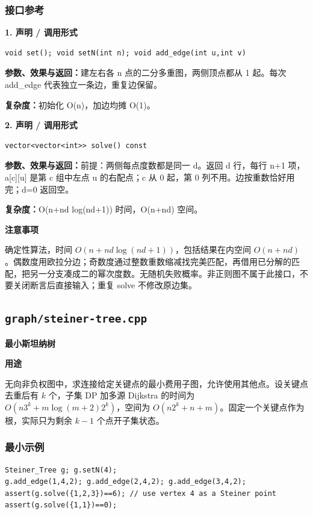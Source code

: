 \documentclass[UTF8,a4paper,10pt]{ctexart}
\newcommand{\TemplUsage}[1]{\textbf{用途}\par #1\par}
\newcommand{\TemplNote}[1]{\textbf{注意事项}\par #1\par}
\begin{document}
\subsubsection*{接口参考}
\noindent\begin{minipage}{\textwidth}
\textbf{1. 声明 / 调用形式}
\begin{lstlisting}
void set(); void setN(int n); void add_edge(int u,int v)
\end{lstlisting}
\textbf{参数、效果与返回：}建左右各 n 点的二分多重图，两侧顶点都从 1 起。每次 add\_edge 代表独立一条边，重复边保留。

\textbf{复杂度：}初始化 O(n)，加边均摊 O(1)。

\end{minipage}\par\vspace{0.4em}
\noindent\begin{minipage}{\textwidth}
\textbf{2. 声明 / 调用形式}
\begin{lstlisting}
vector<vector<int>> solve() const
\end{lstlisting}
\textbf{参数、效果与返回：}前提：两侧每点度数都是同一 d。返回 d 行，每行 n+1 项，a[c][u] 是第 c 组中左点 u 的右配点；c 从 0 起，第 0 列不用。边按重数恰好用完；d=0 返回空。

\textbf{复杂度：}O(n+nd log(nd+1)) 时间，O(n+nd) 空间。

\TemplNote{确定性算法，时间 $O(n+nd\log(nd+1))$，包括结果在内空间 $O(n+nd)$。偶数度用欧拉分边；奇数度通过整数重数缩减找完美匹配，再借用已分解的匹配，把另一分支凑成二的幂次度数。无随机失败概率。非正则图不属于此接口，不要关闭断言后直接输入；重复 solve 不修改原边集。}
\end{minipage}\par\vspace{0.4em}
\clearpage
\subsection{\texttt{graph/steiner-tree.cpp}}
\textbf{最小斯坦纳树}\par
\TemplUsage{无向非负权图中，求连接给定关键点的最小费用子图，允许使用其他点。设关键点去重后有 $k$ 个，子集 DP 加多源 Dijkstra 的时间为 $O(n3^k+m\log(m+2)2^k)$，空间为 $O(n2^k+n+m)$。固定一个关键点作为根，实际只为剩余 $k-1$ 个点开子集状态。}
\subsubsection*{最小示例}
\begin{lstlisting}
Steiner_Tree g; g.setN(4);
g.add_edge(1,4,2); g.add_edge(2,4,2); g.add_edge(3,4,2);
assert(g.solve({1,2,3})==6); // use vertex 4 as a Steiner point
assert(g.solve({1,1})==0);
\end{lstlisting}
\end{document}
